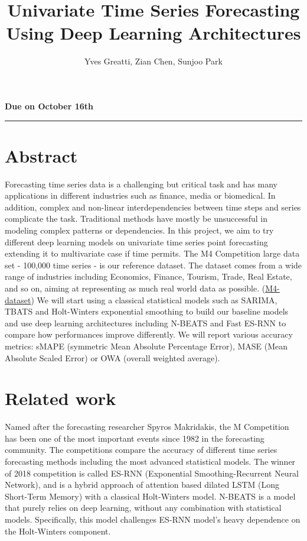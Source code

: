 \documentclass{article}
\title{Univariate Time Series Forecasting Using Deep Learning Architectures}
\author{Yves Greatti, Zian Chen, Sunjoo Park}
\date{}
\begin{document}
\maketitle
\textbf{Due on October 16th}

\noindent\rule{\textwidth}{0.4pt}


\section*{Abstract}
Forecasting time series data is a challenging but critical task and has many applications in different industries such as finance, media or biomedical.
In addition, complex and non-linear interdependencies between time steps and series complicate the task.
Traditional methods have mostly be unsuccessful in modeling complex patterns or dependencies. 
In this project, we aim to try different deep learning models on univariate time series point forecasting extending it to multivariate case if time permits.
The M4 Competition large data set - 100,000 time series - is our reference dataset. The dataset comes from a wide range of industries including Economics, Finance, Tourism, Trade, Real Estate, and so on, aiming at representing as much real world data as possible. (\hyperlink{https://github.com/M4Competition/M4-methods/tree/master/Dataset} {M4-dataset})
We will start using a classical statistical models such as SARIMA, TBATS and Holt-Winters exponential smoothing to build our baseline models and use deep learning architectures 
including N-BEATS \cite{N-BEATS} and Fast ES-RNN \cite{ES-RNN} to compare how performances improve differently. We will report various accuracy metrics: sMAPE (symmetric Mean Absolute Percentage Error), MASE  (Mean Absolute Scaled Error) 
or OWA (overall weighted average).

\section{Related work}
Named after the forecasting researcher Spyros Makridakis, the M Competition has been one of the most important events since 1982 in the forecasting community.
The competitions compare the accuracy of different time series forecasting methods including the most advanced statistical models. The winner of 2018 competition is
called ES-RNN (Exponential Smoothing-Recurrent Neural Network), and is a hybrid approach of attention based dilated LSTM (Long Short-Term Memory) with a classical Holt-Winters model. 
N-BEATS is a model that purely relies on deep learning, without any combination with statistical models. Specifically, this model challenges ES-RNN model's heavy dependence on the Holt-Winters component.  
\end{document}
